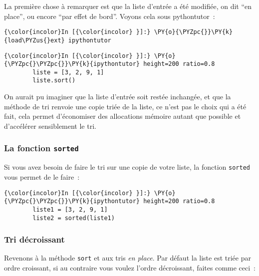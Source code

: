     La première chose à remarquer est que la liste d'entrée a été modifiée,
on dit ``en place'', ou encore ``par effet de bord''. Voyons cela sous
pythontutor~:

    \begin{Verbatim}[commandchars=\\\{\}]
{\color{incolor}In [{\color{incolor} }]:} \PY{o}{\PYZpc{}}\PY{k}{load\PYZus{}ext} ipythontutor
\end{Verbatim}


    \begin{Verbatim}[commandchars=\\\{\}]
{\color{incolor}In [{\color{incolor} }]:} \PY{o}{\PYZpc{}\PYZpc{}}\PY{k}{ipythontutor} height=200 ratio=0.8
        liste = [3, 2, 9, 1]
        liste.sort()
\end{Verbatim}


    On aurait pu imaginer que la liste d'entrée soit restée inchangée, et
que la méthode de tri renvoie une copie triée de la liste, ce n'est pas
le choix qui a été fait, cela permet d'économiser des allocations
mémoire autant que possible et d'accélérer sensiblement le tri.

    \hypertarget{la-fonction-sorted}{%
\subsubsection{\texorpdfstring{La fonction
\texttt{sorted}}{La fonction sorted}}\label{la-fonction-sorted}}

    Si vous avez besoin de faire le tri sur une copie de votre liste, la
fonction \texttt{sorted} vous permet de le faire~:

    \begin{Verbatim}[commandchars=\\\{\}]
{\color{incolor}In [{\color{incolor} }]:} \PY{o}{\PYZpc{}\PYZpc{}}\PY{k}{ipythontutor} height=200 ratio=0.8
        liste1 = [3, 2, 9, 1]
        liste2 = sorted(liste1)
\end{Verbatim}


    \hypertarget{tri-duxe9croissant}{%
\subsubsection{Tri décroissant}\label{tri-duxe9croissant}}

    Revenons à la méthode \texttt{sort} et aux tris \emph{en place}. Par
défaut la liste est triée par ordre croissant, si au contraire vous
voulez l'ordre décroissant, faites comme ceci~:

